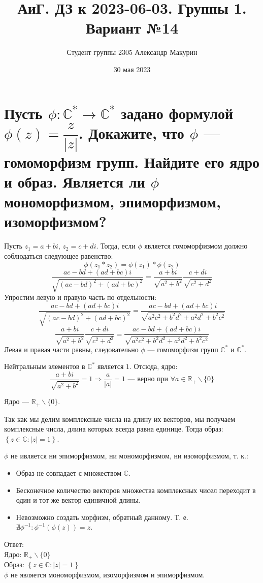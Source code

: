 \documentclass[12pt]{article}
\title{АиГ. ДЗ к 2023-06-03. Группы 1. Вариант №14}
\author{Студент группы 2305 Александр Макурин}
\date{30 мая 2023}
\begin{document}
\maketitle
\section{Пусть $\phi : \mathbb{C}^*\rightarrow \mathbb{C}^*$ задано формулой $\phi(z) = \dfrac{z}{|z|}$. Докажите, что $\phi$ — гомоморфизм групп. Найдите его ядро и образ. Является ли $\phi$ мономорфизмом, эпиморфизмом, изоморфизмом?}
Пусть $z_1 = a + bi$, $z_2 = c + di$. Тогда, если $\phi$ является гомоморфизмом должно соблюдаться следующее равенство:
\[
    \phi(z_1 * z_2) = \phi(z_1) * \phi(z_2)
\]
\[
    \dfrac{ac - bd + (ad + bc)i}{\sqrt{(ac - bd)^2 + (ad + bc)^2}} = \dfrac{a + bi}{\sqrt{a^2 + b^2}} \dfrac{c + di}{\sqrt{c^2 + d^2}}
\]
Упростим левую и правую часть по отдельности:
\[
    \dfrac{ac - bd + (ad + bc)i}{\sqrt{(ac - bd)^2 + (ad + bc)^2}} = \dfrac{ac - bd + (ad + bc)i}{\sqrt{a^2c^2 + b^2d^2 + a^2d^2 + b^2c^2}}
\]
\[
    \dfrac{a + bi}{\sqrt{a^2 + b^2}} \dfrac{c + di}{\sqrt{c^2 + d^2}} = \dfrac{ac - bd + (ad + bc)i}{\sqrt{a^2c^2 + b^2d^2 + a^2d^2 + b^2c^2}}
\]
Левая и правая части равны, следовательно $\phi$ — гомоморфизм групп $\mathbb{C}^*$ и $\mathbb{C}^*$.

Нейтральным элементов в $\mathbb{C}^*$ является $1$. Отсюда, ядро:
\[
    \dfrac{a + bi}{\sqrt{a^2 + b^2}} = 1 \Rightarrow \dfrac{a}{|a|} = 1 \text{ — верно  при } \forall a \in \mathbb{R}_+ \backslash \{0\}
\]

Ядро — $\mathbb{R}_+\backslash\{0\}$.

Так как мы делим комплексные числа на длину их векторов, мы получаем комплексные числа, длина которых всегда равна единице. Тогда образ: $\left\{z \in \mathbb{C} : |z| = 1\right\}$.

$\phi$ не ивляется ни эпиморфизмом, ни мономорфизмом, ни изоморфизмом, т. к.:
\begin{itemize}
    \item Образ не совпадает с множеством $\mathbb{C}$.
    \item Бесконечное количество векторов множества комплексных чисел переходит в один и тот же вектор единичной длины.
    \item Невозможно создать морфизм, обратный данному. Т. е. $\nexists \phi^{-1} : \phi^{-1}(\phi(z)) = z$.
\end{itemize}

\begin{framed}
    Ответ:\\
    Ядро: $\mathbb{R}_+\backslash\{0\}$ \\
    Образ: $\left\{z \in \mathbb{C} : |z| = 1 \right\}$ \\
    $\phi$ не является мономорфизмом, изоморфизмом и эпиморфизмом.
\end{framed}
\end{document}
